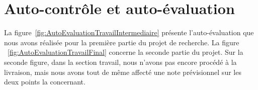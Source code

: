 \documentclass[11pt, french,screen]{report-rd-info}
\begin{document}
\newpage
\printweeksummary
\chapter{Auto-contrôle et auto-évaluation}
La figure~\ref{fig:AutoEvaluationTravailIntermediaire} présente l'auto-évaluation que nous avons réalisée pour la première partie du projet de recherche. La figure ~\ref{fig:AutoEvaluationTravailFinal} concerne la seconde partie du projet. Sur la seconde figure, dans la section travail, nous n'avons pas encore procédé à la livraison, mais nous avons tout de même affecté une note prévisionnel sur les deux points la concernant. 
\begin{figure}
	\centering
     \ifscreen %

\end{figure}
\end{document}
